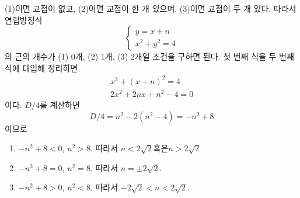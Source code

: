 \documentclass{oblivoir}
\begin{document}
\begin{mdframed}[frametitle=풀이1,nobreak=false]
(1)이면 교점이 없고, (2)이면 교점이 한 개 있으며, (3)이면 교점이 두 개 있다.
따라서 연립방정식
\[\begin{cases}
y=x+n\\
x^2+y^2=4
\end{cases}\]
의 근의 개수가 (1) \(0\)개, (2) \(1\)개, (3) \(2\)개일 조건을 구하면 된다.
첫 번째 식을 두 번째 식에 대입해 정리하면
\begin{gather*}
x^2+(x+n)^2=4\\
2x^2+2nx+n^2-4=0
\end{gather*}
이다.
\(D/4\)를 계산하면
\[D/4=n^2-2(n^2-4)=-n^2+8\]
이므로
\begin{enumerate}
\item
\(-n^2+8<0\), \(n^2>8\).
따라서
\(n<2\sqrt2\)\:\:혹은\:\:\(n>2\sqrt2\)
\item
\(-n^2+8=0\), \(n^2=8\).
따라서 \(n=\pm2\sqrt2\).
\item
\(-n^2+8>0\), \(n^2<8\).
따라서
\(-2\sqrt2<n<2\sqrt2\).
\end{enumerate}
\end{mdframed}
\end{document}
